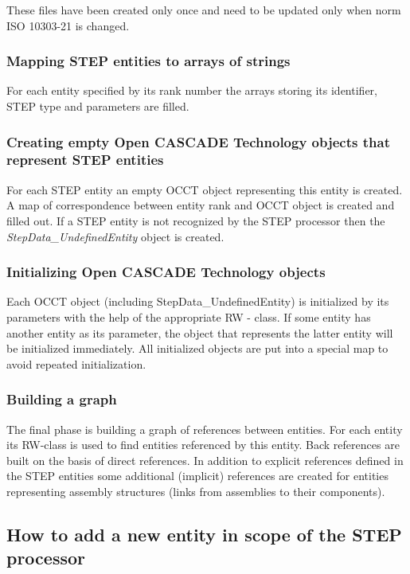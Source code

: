 These files have been created only once and need to be updated only when norm I\+SO 10303-\/21 is changed.\hypertarget{occt_user_guides__step_occt_step_4_2_2}{}\subsubsection{Mapping S\+T\+E\+P entities to arrays of strings}\label{occt_user_guides__step_occt_step_4_2_2}
For each entity specified by its rank number the arrays storing its identifier, S\+T\+EP type and parameters are filled. \hypertarget{occt_user_guides__step_occt_step_4_2_3}{}\subsubsection{Creating empty Open C\+A\+S\+C\+A\+D\+E Technology objects that represent S\+T\+E\+P entities}\label{occt_user_guides__step_occt_step_4_2_3}
For each S\+T\+EP entity an empty O\+C\+CT object representing this entity is created. A map of correspondence between entity rank and O\+C\+CT object is created and filled out. If a S\+T\+EP entity is not recognized by the S\+T\+EP processor then the {\itshape Step\+Data\+\_\+\+Undefined\+Entity} object is created. \hypertarget{occt_user_guides__step_occt_step_4_2_4}{}\subsubsection{Initializing Open C\+A\+S\+C\+A\+D\+E Technology objects}\label{occt_user_guides__step_occt_step_4_2_4}
Each O\+C\+CT object (including Step\+Data\+\_\+\+Undefined\+Entity) is initialized by its parameters with the help of the appropriate RW -\/ class. If some entity has another entity as its parameter, the object that represents the latter entity will be initialized immediately. All initialized objects are put into a special map to avoid repeated initialization. \hypertarget{occt_user_guides__step_occt_step_4_2_5}{}\subsubsection{Building a graph}\label{occt_user_guides__step_occt_step_4_2_5}
The final phase is building a graph of references between entities. For each entity its R\+W-\/class is used to find entities referenced by this entity. Back references are built on the basis of direct references. In addition to explicit references defined in the S\+T\+EP entities some additional (implicit) references are created for entities representing assembly structures (links from assemblies to their components). \hypertarget{occt_user_guides__step_occt_step_4_3}{}\subsection{How to add a new entity in scope of the S\+T\+E\+P processor}\label{occt_user_guides__step_occt_step_4_3}
